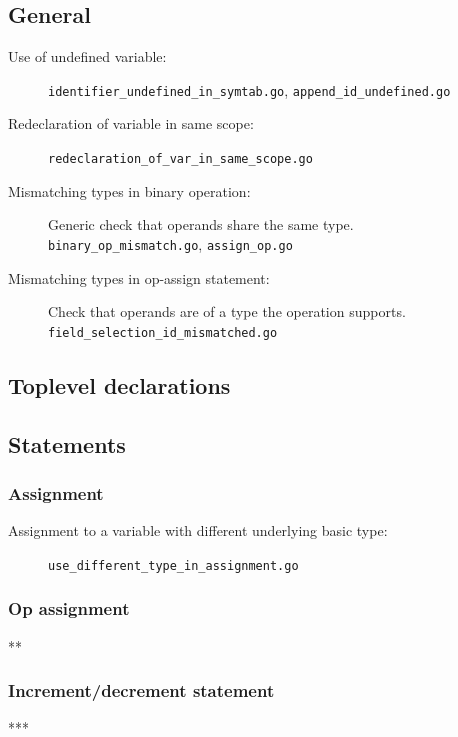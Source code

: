 \documentclass[oneside]{article}
\begin{document}
\subsection{General}

\begin{description}
  \item[Use of undefined variable:] \verb|identifier_undefined_in_symtab.go|, \verb|append_id_undefined.go|
  \item[Redeclaration of variable in same scope:] \verb|redeclaration_of_var_in_same_scope.go|
  \item[Mismatching types in binary operation:] Generic check that operands share the same type. \verb|binary_op_mismatch.go|, \verb|assign_op.go|
  \item[Mismatching types in op-assign statement:] Check that operands are of a type the operation supports. \verb|field_selection_id_mismatched.go|
\end{description}

\subsection{Toplevel declarations}

\subsection{Statements}

\subsubsection{Assignment}
\begin{description}
  \item[Assignment to a variable with different underlying basic type:] \verb|use_different_type_in_assignment.go|
\end{description}

\subsubsection{Op assignment}
\begin{description}
  \item ***
\end{description}

\subsubsection{Increment/decrement statement}
***
\end{document}
